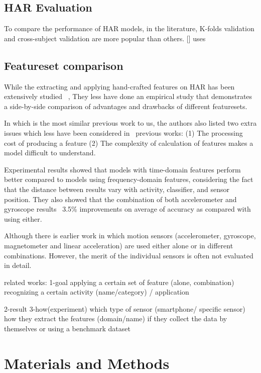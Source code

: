 \documentclass[journal,article,submit,moreauthors,pdftex]{Definitions/mdpi}
\begin{document}
\subsection{HAR Evaluation}
To compare the performance of HAR models, in the literature, K-folds validation and cross-subject validation are more popular than others. [] uses 

\subsection{Featureset comparison}

While the extracting and applying hand-crafted features on HAR has been extensively studied ~\cite{wang2019survey,janidarmian2017comprehensive}, They less have done an empirical study that demonstrates a side-by-side comparison of advantages and drawbacks of different featuresets.

In \cite{rosati2018comparison} which is the most similar previous work to us, the authors also listed two extra issues which less have been considered in \
previous works:
(1) The processing cost of producing a feature
(2) The complexity of calculation of features makes a model difficult to understand.



\cite{s140610146}Experimental results showed that models with time-domain features perform better compared to models using frequency-domain features, considering the fact that the distance between results vary with activity, classifier, and sensor position. They also showed that the combination of both accelerometer and gyroscope results ~3.5\% improvements on average of accuracy as compared with using either.




Although there is earlier work in which motion sensors (accelerometer, gyroscope, magnetometer and linear acceleration) are used either alone or in different combinations. However, the merit of the individual sensors is often not evaluated in detail.


related works: 
1-goal
	applying a certain set of feature (alone, combination) 
	recognizing a certain activity (name/category) / application
	
 2-result
 3-how(experiment)
	which type of sensor (smartphone/ specific sensor)
	how they extract the features (domain/name)
	if they collect the data by themselves or using a benchmark dataset
	

\section{Materials and Methods}
\end{document}
